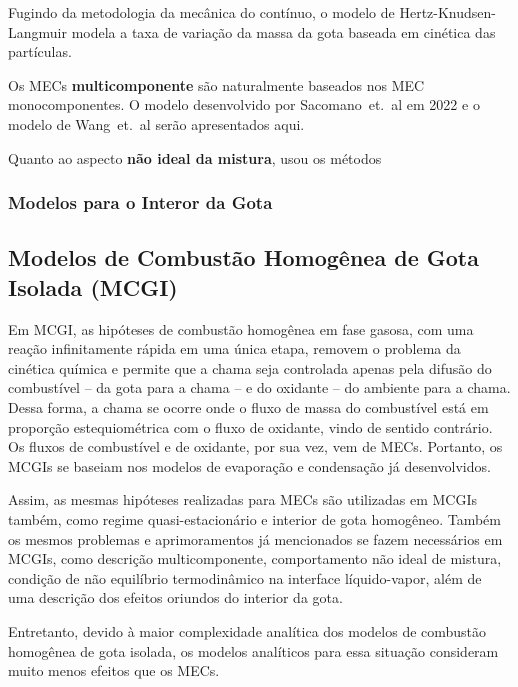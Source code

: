 Fugindo da metodologia da mecânica do contínuo, o modelo de Hertz-Knudsen-Langmuir  modela a taxa de variação da massa da gota baseada em cinética das partículas.

Os MECs \textbf{multicomponente} são naturalmente baseados nos MEC monocomponentes.
O modelo desenvolvido por Sacomano~et.~al em 2022 \cite{SacomanoF2022IJHMT} e o modelo de Wang~et.~al  serão apresentados aqui.

Quanto ao aspecto \textbf{não ideal da mistura}, \cite{SacomanoF2022IJHMT} usou os métodos 


\subsubsection{Modelos para o Interor da Gota} \label{sec:int}



\subsection{Modelos de Combustão Homogênea de Gota Isolada (MCGI)} \label{sec:MCGI}

Em MCGI, as hipóteses de combustão homogênea em fase gasosa, com uma reação infinitamente rápida em uma única etapa, removem o problema da cinética química e permite que a chama seja controlada apenas pela difusão do combustível -- da gota para a chama -- e do oxidante -- do ambiente para a chama.
Dessa forma, a chama se ocorre onde o fluxo de massa do combustível está em proporção estequiométrica com o fluxo de oxidante, vindo de sentido contrário. 
Os fluxos de combustível e de oxidante, por sua vez, vem de MECs.
Portanto, os MCGIs se baseiam nos modelos de evaporação e condensação já desenvolvidos.

Assim, as mesmas hipóteses realizadas para MECs são utilizadas em MCGIs também, como regime quasi-estacionário e interior de gota homogêneo.
Também os mesmos problemas e aprimoramentos já mencionados se fazem necessários em MCGIs, como descrição multicomponente, comportamento não ideal de mistura, condição de não equilíbrio termodinâmico na interface líquido-vapor, além de uma descrição dos efeitos oriundos do interior da gota.

Entretanto, devido à maior complexidade analítica dos modelos de combustão homogênea de gota isolada, os modelos analíticos para essa situação consideram muito menos efeitos que os MECs.


